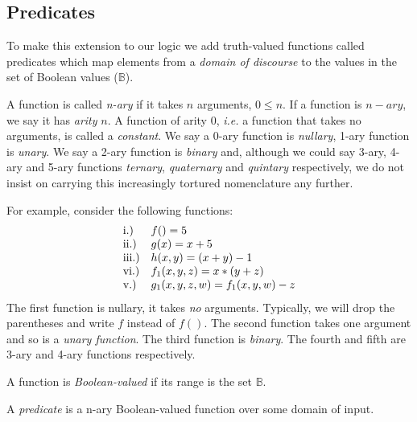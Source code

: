 \documentclass[11pt]{article}
\newcommand{\bool}{\mathbb{B}}
\begin{document}
\subsection{Predicates}

To make this extension to our logic we add truth-valued functions 
called predicates which map elements from a {\em{domain of discourse}}
to the values in the set of Boolean values ($\bool$). 


\begin{definition}[arity]
    
 A function is called {\em{n-ary}} if it takes $n$ arguments,
$0\le{}n$.  If a function is $n-ary$, we say it has {\em{arity}} $n$.  A
function of arity $0$, {\em{i.e.}} a function that takes no arguments, is
called a {\em{constant}}.  We say a 0-ary function is {\em{nullary}}, 1-ary
function is {\em{unary}}.  We say a 2-ary function is {\em{binary}} and,
although we could say 3-ary, 4-ary and 5-ary functions {\em{ternary}},
{\em{quaternary}} and {\em{quintary}} respectively, we do not insist on
carrying this increasingly tortured nomenclature any further.

\end{definition}


For example, consider the following functions:
\[\begin{array}{ll}
{\rm{i.)}} & f() = 5\\
{\rm{ii.)}} & g(x) = x + 5\\
{\rm{iii.)}} & h(x,y) = (x + y) - 1\\
{\rm{vi.)}} &  f_1(x,y,z) = x * (y + z)\\
{\rm{v.)}} &  g_1(x,y,z,w) = f_1(x,y,w)  - z
\end{array}\]
The first function is nullary, it takes {\em{no}} arguments.  Typically,
we will drop the parentheses and write $f$ instead of $f()$.  The
second function takes one argument and so is a {\em{unary function}}.
The third function is {\em{binary}}.  The fourth and fifth are 3-ary
and 4-ary functions respectively.


\begin{definition}
 A function is {\em{Boolean-valued}} if its range is the
set $\bool$.
\end{definition}

\begin{definition}[predicate]
A {\em{predicate}} is a n-ary Boolean-valued function over
some domain of input.
\end{definition}
\end{document}
